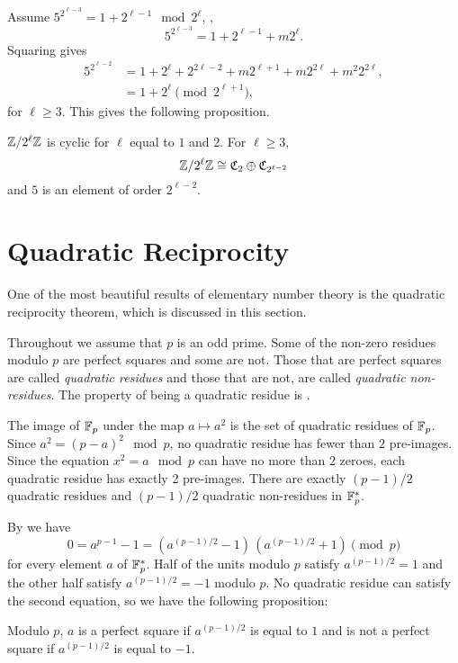 Assume $5^{2^{\ell-3}} = 1 + 2^{\ell -1} \mod{2^\ell}$, \ie,
\[
  5^{2^{\ell-3}} = 1 + 2^{\ell-1} + m 2^{\ell}.
\]
Squaring gives
\[
\begin{aligned}
  5^{2^{\ell-2}} 
    &= 1 + 2^{\ell} + 2^{2\ell-2} + m 2^{\ell+1} + m 2^{2\ell} + m^2 2^{2\ell}, \\
    & = 1 + 2^{\ell} \pmod{2^{\ell+1}},
\end{aligned}
\]
for $\ell \ge 3$. This gives the following proposition.

\begin{proposition}
$\mathbb{Z}/2^{\ell}\mathbb{Z}$ is cyclic for $\ell$ equal to $1$ and $2$.  For $\ell
\ge 3$, 
\[
\mathbb{Z}/2^{\ell}\mathbb{Z} \cong \mathfrak{C}_2 \oplus \mathfrak{C}_{2^{\ell-2}}
\]
and $5$ is an element of order $2^{\ell-2}$.
\end{proposition}


\section{Quadratic Reciprocity}
\label{Quadratic:Reciprocity:Sec}

One of the most beautiful results of elementary number theory is the
quadratic reciprocity theorem, which is discussed in this section.   

Throughout we assume that $p$ is an odd prime. Some of the non-zero residues
modulo $p$ are perfect squares and some are not.  Those that are
perfect squares are called {\em quadratic residues} and those that are not, are called {\em quadratic
non-residues}. The property of being a
quadratic residue is .

The image of $\mathbb{F}_p$ under the map $a \mapsto a^2$ is the set of
quadratic residues of $\mathbb{F}_p$.  Since $a^2 = (p-a)^2 \mod{p}$, no
quadratic residue has fewer than $2$ pre-images.  Since the equation
$x^2 = a
\mod{p}$ can have no more than $2$ zeroes, each quadratic residue has
exactly 2 pre-images.  There are exactly $(p-1)/2$ quadratic residues
and $(p-1)/2$ quadratic non-residues in $\mathbb{F}_p^{\ast}$.

By  we have
\[
0 = a^{p-1} - 1 = (a^{(p-1)/2} - 1)\,  (a^{(p-1)/2} + 1) \pmod{p}
\]
for every element $a$ of $\mathbb{F}_p^{\ast}$.  Half of the units modulo $p$
satisfy $a^{(p-1)/2} = 1$ and the other half satisfy $a^{(p-1)/2} =
-1$ modulo $p$.  No quadratic residue can satisfy the second equation,
so we have the following proposition:

\begin{proposition} \label{FF:Euler:Residue:Prop}
Modulo $p$, $a$ is a perfect square if $a^{(p-1)/2}$ is equal to $1$
and is not a perfect square if $a^{(p-1)/2}$ is equal to $-1$.
\end{proposition}

